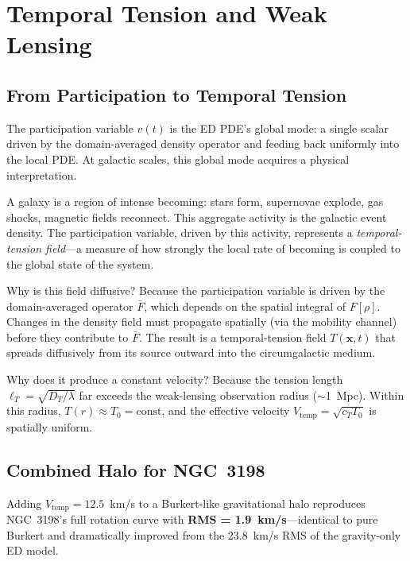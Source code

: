 \documentclass[12pt,letterpaper]{article}
\begin{document}
\section{Temporal Tension and Weak Lensing}

\subsection{From Participation to Temporal Tension}

The participation variable $v(t)$ is the ED PDE's global mode: a single scalar driven by the domain-averaged density operator and feeding back uniformly into the local PDE. At galactic scales, this global mode acquires a physical interpretation.

A galaxy is a region of intense becoming: stars form, supernovae explode, gas shocks, magnetic fields reconnect. This aggregate activity is the galactic event density. The participation variable, driven by this activity, represents a \emph{temporal-tension field}---a measure of how strongly the local rate of becoming is coupled to the global state of the system.

Why is this field diffusive? Because the participation variable is driven by the domain-averaged operator $\bar{F}$, which depends on the spatial integral of $F[\rho]$. Changes in the density field must propagate spatially (via the mobility channel) before they contribute to $\bar{F}$. The result is a temporal-tension field $T(\mathbf{x},t)$ that spreads diffusively from its source outward into the circumgalactic medium.

Why does it produce a constant velocity? Because the tension length $\ell_T = \sqrt{D_T/\lambda}$ far exceeds the weak-lensing observation radius ($\sim$1~Mpc). Within this radius, $T(r) \approx T_0 = \mathrm{const}$, and the effective velocity $V_{\mathrm{temp}} = \sqrt{c_T T_0}$ is spatially uniform.

\subsection{Combined Halo for NGC~3198}

Adding $V_{\mathrm{temp}} = 12.5$~km/s to a Burkert-like gravitational halo reproduces NGC~3198's full rotation curve with \textbf{RMS = 1.9~km/s}---identical to pure Burkert and dramatically improved from the 23.8~km/s RMS of the gravity-only ED model.
\end{document}
